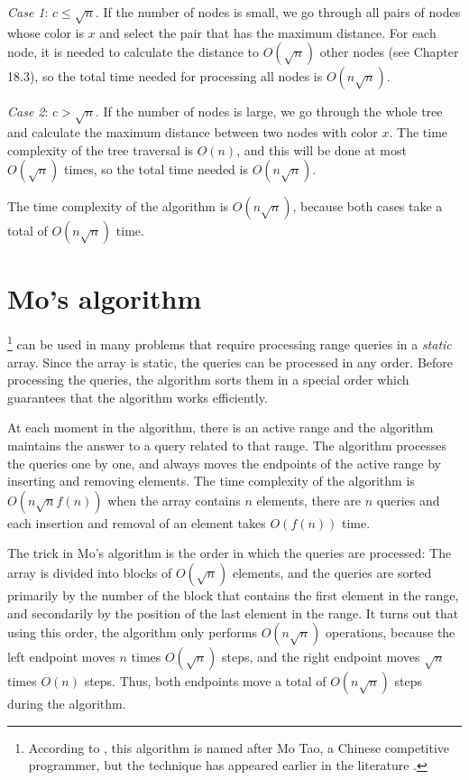 \emph{Case 1}: $c \le \sqrt n$.
If the number of nodes is small,
we go through all pairs of nodes whose
color is $x$ and select the pair that
has the maximum distance.
For each node, it is needed to calculate the distance
to $O(\sqrt n)$ other nodes (see Chapter 18.3),
so the total time needed for processing all
nodes is $O(n \sqrt n)$.

\emph{Case 2}: $c > \sqrt n$.
If the number of nodes is large,
we go through the whole tree
and calculate the maximum distance between
two nodes with color $x$.
The time complexity of the tree traversal is $O(n)$,
and this will be done at most $O(\sqrt n)$ times,
so the total time needed is $O(n \sqrt n)$.

The time complexity of the algorithm is $O(n \sqrt n)$,
because both cases take a total of $O(n \sqrt n)$ time.

\section{Mo's algorithm}


\footnote{According to \cite{cod15}, this algorithm
is named after Mo Tao, a Chinese competitive programmer, but
the technique has appeared earlier in the literature \cite{ken06}.}
can be used in many problems
that require processing range queries in 
a \emph{static} array.
Since the array is static, the queries can be
processed in any order.
Before processing the queries, the algorithm
sorts them in a special order which guarantees
that the algorithm works efficiently.

At each moment in the algorithm, there is an active
range and the algorithm maintains the answer
to a query related to that range.
The algorithm processes the queries one by one,
and always moves the endpoints of the
active range by inserting and removing elements.
The time complexity of the algorithm is
$O(n \sqrt n f(n))$ when the array contains
$n$ elements, there are $n$ queries
and each insertion and removal of an element
takes $O(f(n))$ time.

The trick in Mo's algorithm is the order
in which the queries are processed:
The array is divided into blocks of $O(\sqrt n)$
elements, and the queries are sorted primarily by
the number of the block that contains the first element
in the range, and secondarily by the position of the
last element in the range.
It turns out that using this order, the algorithm
only performs $O(n \sqrt n)$ operations,
because the left endpoint moves
$n$ times $O(\sqrt n)$ steps,
and the right endpoint moves
$\sqrt n$ times $O(n)$ steps. Thus, both
endpoints move a total of $O(n \sqrt n)$ steps during the algorithm.

